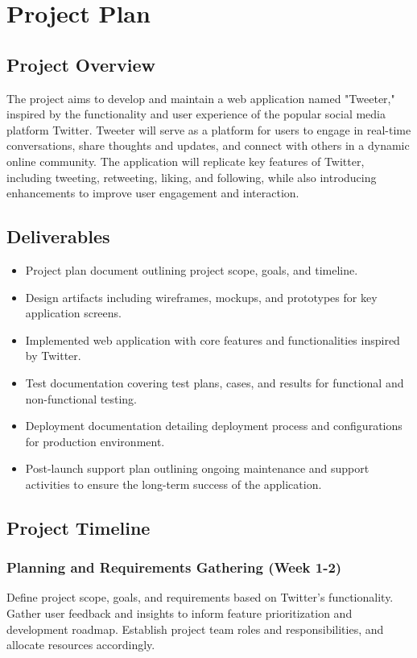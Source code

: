 \documentclass{article}
\begin{document}
\section{Project Plan}

\subsection{Project Overview}
The project aims to develop and maintain a web application named "Tweeter," inspired by the functionality and user experience of the popular social media platform Twitter. Tweeter will serve as a platform for users to engage in real-time conversations, share thoughts and updates, and connect with others in a dynamic online community. The application will replicate key features of Twitter, including tweeting, retweeting, liking, and following, while also introducing enhancements to improve user engagement and interaction.

\subsection{Deliverables}
\begin{itemize}
    \item Project plan document outlining project scope, goals, and timeline.
    \item Design artifacts including wireframes, mockups, and prototypes for key application screens.
    \item Implemented web application with core features and functionalities inspired by Twitter.
    \item Test documentation covering test plans, cases, and results for functional and non-functional testing.
    \item Deployment documentation detailing deployment process and configurations for production environment.
    \item Post-launch support plan outlining ongoing maintenance and support activities to ensure the long-term success of the application.
\end{itemize}

\subsection{Project Timeline}
\subsubsection{Planning and Requirements Gathering (Week 1-2)}
Define project scope, goals, and requirements based on Twitter's functionality. Gather user feedback and insights to inform feature prioritization and development roadmap. Establish project team roles and responsibilities, and allocate resources accordingly.
\end{document}

